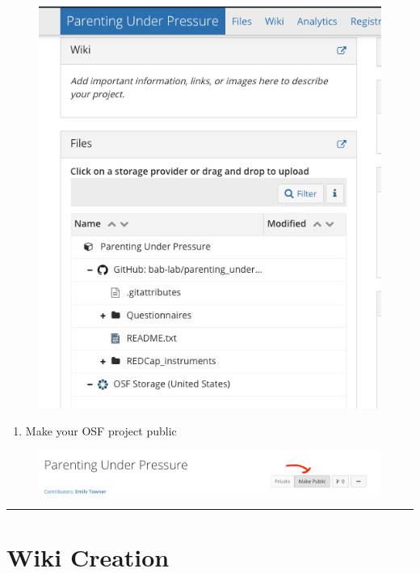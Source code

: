 \documentclass[]{book}
\providecommand{\tightlist}{%
  \setlength{\itemsep}{0pt}\setlength{\parskip}{0pt}}
\begin{document}
\begin{figure}
\centering
\includegraphics{images/research_protocols/osf/9.png}
\caption{}
\end{figure}

\begin{enumerate}
\def\labelenumi{\arabic{enumi}.}
\setcounter{enumi}{7}
\tightlist
\item
  Make your OSF project public
\end{enumerate}

\begin{figure}
\centering
\includegraphics{images/research_protocols/osf/10.png}
\caption{}
\end{figure}

\begin{center}\rule{0.5\linewidth}{0.5pt}\end{center}

\section{Wiki Creation}\label{wiki-creation}
\end{document}
